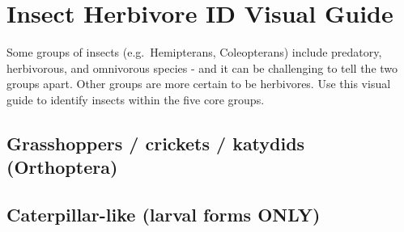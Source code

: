 \documentclass[
  letterpaper,
  oneside,
  open=any]{scrbook}
\begin{document}
\section{Insect Herbivore ID Visual
Guide}\label{insect-herbivore-id-visual-guide}

Some groups of insects (e.g.~Hemipterans, Coleopterans) include
predatory, herbivorous, and omnivorous species - and it can be
challenging to tell the two groups apart. Other groups are more certain
to be herbivores. Use this visual guide to identify insects within the
five core groups.

\subsection{Grasshoppers / crickets / katydids
(Orthoptera)}\label{grasshoppers-crickets-katydids-orthoptera}

\begin{figure}


\caption{\label{fig-herbvivores1}}

\end{figure}%

\subsection{Caterpillar-like (larval forms
ONLY)}\label{caterpillar-like-larval-forms-only}

\begin{figure}


\caption{\label{fig-herbvivores2}}

\end{figure}%
\end{document}
